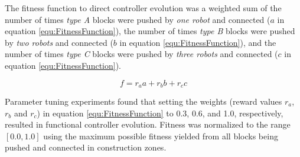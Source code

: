The fitness function to direct controller evolution was a weighted sum of
the number of times \textit{type A} blocks were pushed by \textit{one robot}
and connected (\(a\) in equation \ref{equ:FitnessFunction}), the number of times \textit{type B} blocks were pushed
by \textit{two robots} and connected (\(b\) in equation \ref{equ:FitnessFunction}),
and the number of times \textit{type C} blocks were pushed by \textit{three robots}
and connected (\(c\) in equation \ref{equ:FitnessFunction}).

\begin{equation}\label{equ:FitnessFunction}
f = r_a a + r_b b + r_c c
\end{equation}

Parameter tuning experiments found that setting the weights (reward values \(r_a\), \(r_b\) and \(r_c\))
in equation \ref{equ:FitnessFunction} to 0.3, 0.6, and 1.0, respectively, resulted in functional controller evolution.
Fitness was normalized to the range \([0.0, 1.0]\) using the maximum possible fitness yielded from
all blocks being pushed and connected in construction zones.

